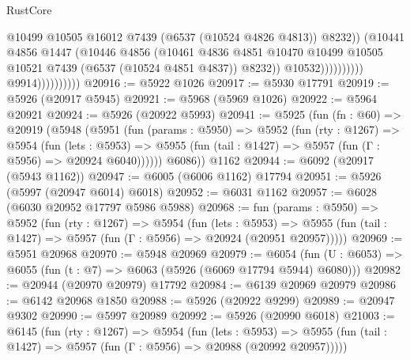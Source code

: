 \begin{lexlean}{RustCore}
\begin{coremodule}
                                              @10499
                                              @10505
                                              @16012
                                              @7439
                                              (@6537 (@10524 @4826 @4813))
                                              @8232))
                                          (@10441
                                            @4856
                                            @1447
                                            (@10446
                                              @4856
                                              (@10461
                                                @4836
                                                @4851
                                                @10470
                                                @10499
                                                @10505
                                                @10521
                                                @7439
                                                (@6537 (@10524 @4851 @4837))
                                                @8232))
                                            @10532))))))))))
                        @9914))))))))))
@20916 := @5922 @1026
@20917 := @5930 @17791
@20919 := @5926 (@20917 @5945)
@20921 := @5968 (@5969 @1026)
@20922 := @5964 @20921
@20924 := @5926 (@20922 @5993)
@20941 := @5925
    (fun (fn : @60) =>
    @20919
      (@5948
        (@5951
          (fun (params : @5950) =>
          @5952
            (fun (rty : @1267) =>
            @5954
              (fun (lets : @5953) =>
              @5955 (fun (tail : @1427) => @5957 (fun (Γ : @5956) => @20924 @6040))))))
        @6086))
    @1162
@20944 := @6092 (@20917 (@5943 @1162))
@20947 := @6005 (@6006 @1162) @17794
@20951 := @5926 (@5997 (@20947 @6014) @6018)
@20952 := @6031 @1162
@20957 := @6028 (@6030 @20952 @17797 @5986 @5988)
@20968 := fun (params : @5950) =>
  @5952
    (fun (rty : @1267) =>
    @5954
      (fun (lets : @5953) =>
      @5955 (fun (tail : @1427) => @5957 (fun (Γ : @5956) => @20924 (@20951 @20957)))))
@20969 := @5951 @20968
@20970 := @5948 @20969
@20979 := @6054
    (fun (U : @6053) => @6055 (fun (t : @7) => @6063 (@5926 (@6069 @17794 @5944) @6080)))
@20982 := @20944 (@20970 @20979) @17792
@20984 := @6139 @20969 @20979
@20986 := @6142 @20968 @1850
@20988 := @5926 (@20922 @9299)
@20989 := @20947 @9302
@20990 := @5997 @20989
@20992 := @5926 (@20990 @6018)
@21003 := @6145
    (fun (rty : @1267) =>
    @5954
      (fun (lets : @5953) =>
      @5955 (fun (tail : @1427) => @5957 (fun (Γ : @5956) => @20988 (@20992 @20957)))))

\end{coremodule}
\end{lexlean}
